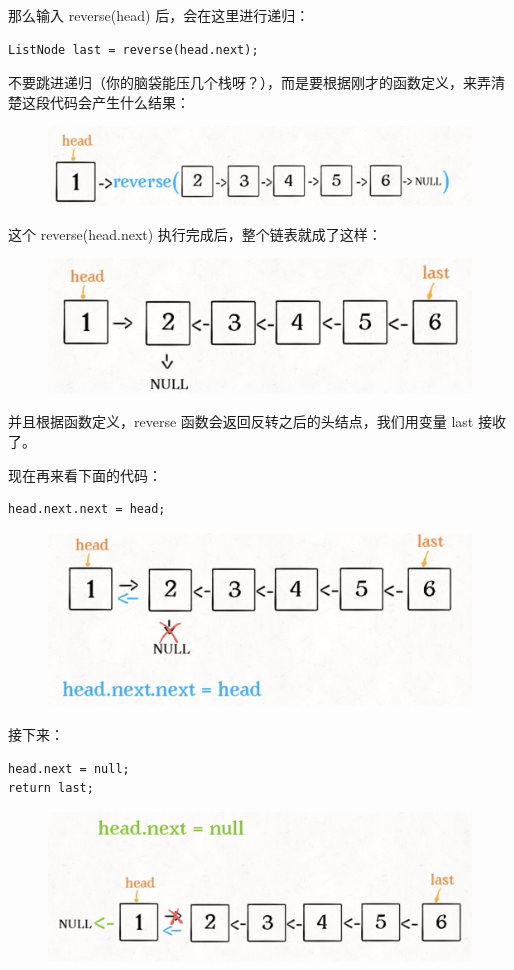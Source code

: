 \documentclass[12pt]{article}
\begin{document}
那么输入 reverse(head) 后，会在这里进行递归：
\begin{lstlisting}
ListNode last = reverse(head.next);
\end{lstlisting}

不要跳进递归（你的脑袋能压几个栈呀？），而是要根据刚才的函数定义，来弄清楚这段代码会产生什么结果：
\begin{figure}[H]
    \centering
    \includegraphics[width=.5\textwidth]{fig/Reverse_Single_List_3.png}
\end{figure}

这个 reverse(head.next) 执行完成后，整个链表就成了这样：
\begin{figure}[H]
    \centering
    \includegraphics[width=.5\textwidth]{fig/Reverse_Single_List_4.png}
\end{figure}

并且根据函数定义，reverse 函数会返回反转之后的头结点，我们用变量 last 接收了。

现在再来看下面的代码：
\begin{lstlisting}
head.next.next = head;
\end{lstlisting}

\begin{figure}[H]
    \centering
    \includegraphics[width=.5\textwidth]{fig/Reverse_Single_List_5.png}
\end{figure}

接下来：
\begin{lstlisting}
head.next = null;
return last;
\end{lstlisting}

\begin{figure}[H]
    \centering
    \includegraphics[width=.5\textwidth]{fig/Reverse_Single_List_6.png}
\end{figure}
\end{document}
